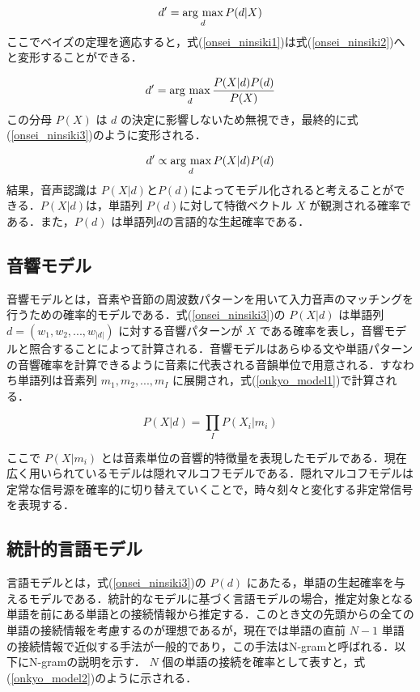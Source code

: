 \begin{equation}
    d' = \mathop{\rm arg~max}\limits_{d} P(d|X) 
    \label{onsei_ninsiki1}
\end{equation}
ここでベイズの定理を適応すると，式(\ref{onsei_ninsiki1})は式(\ref{onsei_ninsiki2})へと変形することができる．

\begin{equation}
    d' = \mathop{\rm arg~max}\limits_{d}  \frac{P(X|d)P(d)}{P(X)} 
    \label{onsei_ninsiki2}
\end{equation}
この分母 $P(X)$ は $d$ の決定に影響しないため無視でき，最終的に式(\ref{onsei_ninsiki3})のように変形される．

\begin{equation}
    d' \propto \mathop{\rm arg~max}\limits_{d}  P(X|d)P(d) 
    \label{onsei_ninsiki3}
\end{equation}
結果，音声認識は $P(X|d)$と$P(d)$によってモデル化されると考えることができる．$P(X|d)$は，単語列 $P(d)$に対して特徴ベクトル $X$ が観測される確率である．また，$P(d)$ は単語列$d$の言語的な生起確率である．

\subsection{音響モデル}
音響モデルとは，音素や音節の周波数パターンを用いて入力音声のマッチングを行うための確率的モデルである．式(\ref{onsei_ninsiki3})の $P(X|d)$ は単語列 $d = (w_1, w_2, ..., w_{|d|})$ に対する音響パターンが $X$ である確率を表し，音響モデルと照合することによって計算される．音響モデルはあらゆる文や単語パターンの音響確率を計算できるように音素に代表される音韻単位で用意される．すなわち単語列は音素列 $m_1, m_2, ... , m_I $ に展開され，式(\ref{onkyo_model1})で計算される．

\begin{equation}
    P(X|d) = \prod_{I}  P(X_i|m_i) 
    \label{onkyo_model1}
\end{equation}

ここで $P(X|m_i)$ とは音素単位の音響的特徴量を表現したモデルである．現在広く用いられているモデルは隠れマルコフモデルである．隠れマルコフモデルは定常な信号源を確率的に切り替えていくことで，時々刻々と変化する非定常信号を表現する．

\subsection{統計的言語モデル}

言語モデルとは，式(\ref{onsei_ninsiki3})の $P(d)$ にあたる，単語の生起確率を与えるモデルである．統計的なモデルに基づく言語モデルの場合，推定対象となる単語を前にある単語との接続情報から推定する．このとき文の先頭からの全ての単語の接続情報を考慮するのが理想であるが，現在では単語の直前 $N-1$ 単語の接続情報で近似する手法が一般的であり，この手法はN-gramと呼ばれる．以下にN-gramの説明を示す． 
 $N$ 個の単語の接続を確率として表すと，式(\ref{onkyo_model2})のように示される．

